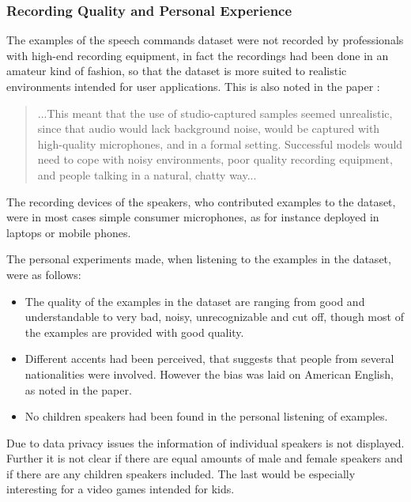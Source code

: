 \subsubsection{Recording Quality and Personal Experience}
The examples of the speech commands dataset \cite{Warden2018} were not recorded by professionals with high-end recording equipment, in fact the recordings had been done in an amateur kind of fashion, so that the dataset is more suited to realistic environments intended for user applications.
This is also noted in the paper \cite{Warden2018}:
\begin{quote}
...This meant that the use of studio-captured samples seemed unrealistic, since that audio would lack background noise, would be captured with high-quality microphones, and in a formal setting. 
Successful models would need to cope with noisy environments, poor quality recording equipment, and people talking in a natural, chatty way...
\end{quote}
The recording devices of the speakers, who contributed examples to the dataset, were in most cases simple consumer microphones, as for instance deployed in laptops or mobile phones.

The personal experiments made, when listening to the examples in the dataset, were as follows:
\begin{itemize}
  \item The quality of the examples in the dataset are ranging from good and understandable to very bad, noisy, unrecognizable and cut off, though most of the examples are provided with good quality.

  \item Different accents had been perceived, that suggests that people from several nationalities were involved. 
  However the bias was laid on American English, as noted in the paper.

  \item No children speakers had been found in the personal listening of examples.
\end{itemize}

Due to data privacy issues the information of individual speakers is not displayed.
Further it is not clear if there are equal amounts of male and female speakers and if there are any children speakers included.
The last would be especially interesting for a video games intended for kids.

